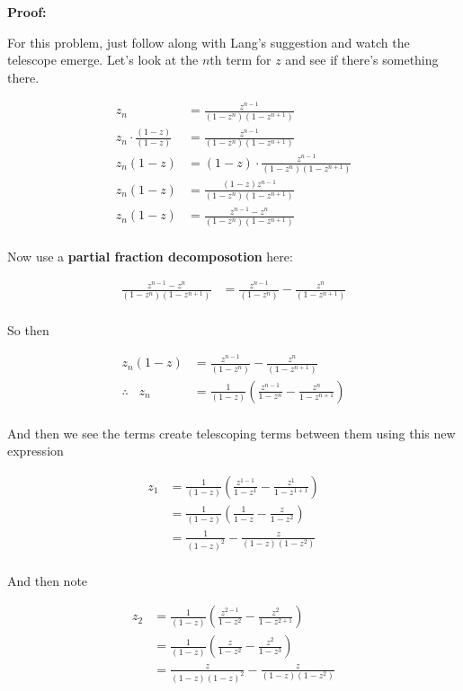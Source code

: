 \begin{enumerate}
	\textbf{Proof:}
	
	For this problem, just follow along with Lang's suggestion and watch the telescope emerge. Let's look at the $n$th term for $z$ and see 
	if there's something there.

	\begin{align*}
		z_n &= \frac{z^{n - 1}}{(1 - z^{n})(1 - z^{n + 1})} \\
		z_n \cdot \frac{(1 - z)}{(1 - z)} &= \frac{z^{n - 1}}{(1 - z^{n})(1 - z^{n + 1})} \\
		z_n (1 - z) &= (1 - z) \cdot \frac{z^{n - 1}}{(1 - z^{n})(1 - z^{n + 1})} \\
		z_n (1 - z) &=  \frac{(1 - z)z^{n - 1}}{(1 - z^{n})(1 - z^{n + 1})} \\
		z_n (1 - z) &=  \frac{z^{n - 1} - z^n}{(1 - z^{n})(1 - z^{n + 1})} \\
	\end{align*}

	Now use a \textbf{partial fraction decomposotion} here:

	\begin{align*}
		\frac{z^{n - 1} - z^n}{(1 - z^{n})(1 - z^{n + 1})} &=  \frac{z^{n - 1}}{(1 - z^{n})} - \frac{z^n}{(1 - z^{n + 1})} \\
	\end{align*}

	So then

	\begin{align*}
		z_n (1 - z) &=  \frac{z^{n - 1}}{(1 - z^{n})} - \frac{z^n}{(1 - z^{n + 1})} \\
		\therefore \;\;\; z_n &=  \frac{1}{(1 - z)} \left( \frac{z^{n - 1}}{1 - z^{n}} - \frac{z^n}{1 - z^{n + 1}} \right) \\
	\end{align*}

	And then we see the terms create telescoping terms between them using this new expression

	\begin{align*}
		z_1 &= \frac{1}{(1 - z)} \left( \frac{z^{1 - 1}}{1 - z^{1}} - \frac{z^1}{1 - z^{1 + 1}} \right) \\
		&= \frac{1}{(1 - z)} \left( \frac{1}{1 - z} - \frac{z}{1 - z^{2}} \right) \\
		&= \frac{1}{(1 - z)^2} - \frac{z}{(1 - z)(1 - z^{2})} \\
	\end{align*}

	And then note

	\begin{align*}
		z_2 &= \frac{1}{(1 - z)} \left( \frac{z^{2 - 1}}{1 - z^{2}} - \frac{z^2}{1 - z^{2 + 1}} \right) \\
		&= \frac{1}{(1 - z)} \left( \frac{z}{1 - z^2} - \frac{z^2}{1 - z^{3}} \right) \\
		&= \frac{z}{(1 - z)(1 - z)^2} - \frac{z}{(1 - z)(1 - z^{2})} \\
	\end{align*}


\end{enumerate}
